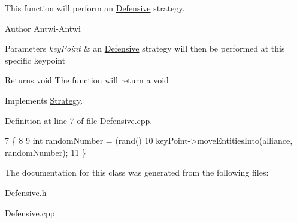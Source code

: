 This function will perform an \hyperlink{classDefensive}{Defensive} strategy. 

\begin{DoxyAuthor}{Author}
Antwi-\/\+Antwi
\end{DoxyAuthor}

\begin{DoxyParams}{Parameters}
{\em key\+Point} & an \hyperlink{classDefensive}{Defensive} strategy will then be performed at this specific keypoint\\
\hline
\end{DoxyParams}
\begin{DoxyReturn}{Returns}
void The function will return a void 
\end{DoxyReturn}


Implements \hyperlink{classStrategy}{Strategy}.



Definition at line 7 of file Defensive.\+cpp.


\begin{DoxyCode}
7                                                                    \{
8 
9     \textcolor{keywordtype}{int} randomNumber = (rand() %
10     keyPoint->moveEntitiesInto(alliance, randomNumber);
11 \}
\end{DoxyCode}


The documentation for this class was generated from the following files\+:\begin{DoxyCompactItemize}
\item 
Defensive.\+h\item 
Defensive.\+cpp\end{DoxyCompactItemize}
